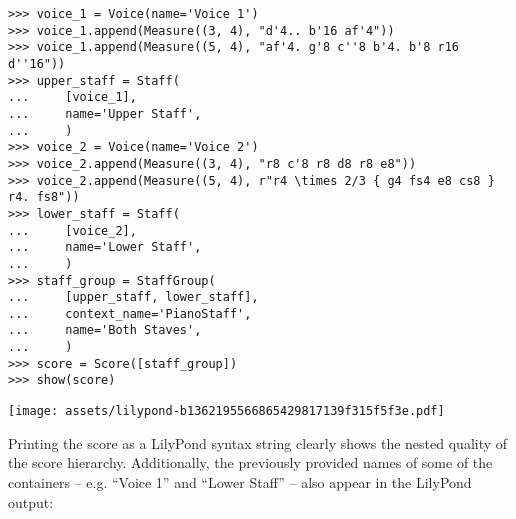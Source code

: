\begin{abjadbookoutput}
\begin{singlespacing}
\vspace{-0.5\baselineskip}
\begin{verbatim}
>>> voice_1 = Voice(name='Voice 1')
>>> voice_1.append(Measure((3, 4), "d'4.. b'16 af'4"))
>>> voice_1.append(Measure((5, 4), "af'4. g'8 c''8 b'4. b'8 r16 d''16"))
>>> upper_staff = Staff(
...     [voice_1],
...     name='Upper Staff',
...     )
>>> voice_2 = Voice(name='Voice 2')
>>> voice_2.append(Measure((3, 4), "r8 c'8 r8 d8 r8 e8"))
>>> voice_2.append(Measure((5, 4), r"r4 \times 2/3 { g4 fs4 e8 cs8 } r4. fs8"))
>>> lower_staff = Staff(
...     [voice_2],
...     name='Lower Staff',
...     )
>>> staff_group = StaffGroup(
...     [upper_staff, lower_staff],
...     context_name='PianoStaff',
...     name='Both Staves',
...     )
>>> score = Score([staff_group])
>>> show(score)
\end{verbatim}
\noindent\texttt{[image: assets/lilypond-b1362195566865429817139f315f5f3e.pdf]}
\end{singlespacing}
\end{abjadbookoutput}

\noindent Printing the score as a LilyPond syntax string clearly shows the
nested quality of the score hierarchy. Additionally, the previously provided
names of some of the containers -- e.g. \enquote{Voice 1} and \enquote{Lower
Staff} -- also appear in the LilyPond output:

\begin{comment}
<abjad>
print(format(score))
</abjad>
\end{comment}

